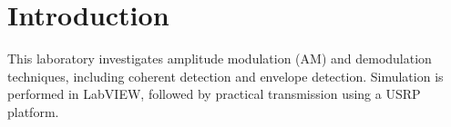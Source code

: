 \section{Introduction}

This laboratory investigates amplitude modulation (AM) and demodulation techniques,
including coherent detection and envelope detection.
Simulation is performed in LabVIEW, followed by practical transmission using a USRP platform.